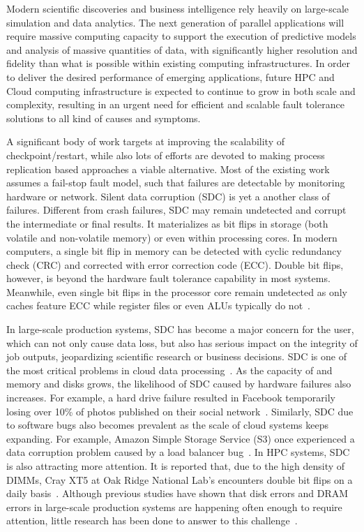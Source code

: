 Modern scientific discoveries and business intelligence rely heavily on large-scale simulation and data analytics. The next generation of parallel applications will require massive computing capacity to support the execution of predictive models and analysis of massive quantities of data, with significantly higher resolution and fidelity than what is possible within existing computing infrastructures. In order to deliver the desired performance of emerging  applications, future HPC and Cloud computing infrastructure is expected to continue to grow in both scale and complexity, resulting in an urgent need for efficient and scalable fault tolerance solutions to all kind of causes and symptoms. 

A significant body of work targets at improving the scalability of checkpoint/restart, while also lots of efforts are devoted to making process replication based approaches a viable alternative. Most of the existing work assumes a fail-stop fault model, such that failures are detectable by monitoring hardware or network. Silent data corruption (SDC) is yet a another class of failures. Different from crash failures, SDC may remain undetected and corrupt the intermediate or final results. It materializes as bit flips in storage (both volatile and non-volatile memory) or even within processing cores. In modern computers, a single bit flip in memory can be detected with cyclic redundancy check (CRC) and corrected with error correction code (ECC). Double bit flips, however, is beyond the hardware fault tolerance capability in most systems. Meanwhile, even single bit flips in the processor core remain undetected as only caches feature ECC while register files or even ALUs typically do not~\cite{fiala_2012_sdc}.



In large-scale production systems, SDC has become a major concern for the user, which can not only cause data loss, but also has serious impact on the integrity of job outputs, jeopardizing scientific research or business decisions. 
SDC is one of the most critical problems in cloud data processing~\cite{wang2015understanding}. 
As the capacity of and memory and disks grows, the likelihood of SDC caused by hardware failures also increases. For example, a hard drive failure resulted in Facebook temporarily losing over 10\% of photos published on their social network~\cite{wang2015understanding}. Similarly, SDC due to software bugs also becomes prevalent as the scale of cloud systems keeps expanding. For example, Amazon Simple Storage Service (S3) once experienced a data corruption problem caused by a load balancer bug~\cite{balding2009question}. In HPC systems, SDC is also attracting more attention. It is reported that, due to the high density of DIMMs, Cray XT5 at Oak Ridge National Lab’s encounters double bit flips on a daily basis~\cite{geist2011monster}. Although previous studies  have shown that disk errors and DRAM errors in large-scale production systems are happening often enough to require attention, little research has been done to answer to this challenge~\cite{fiala_2012_sdc}.

